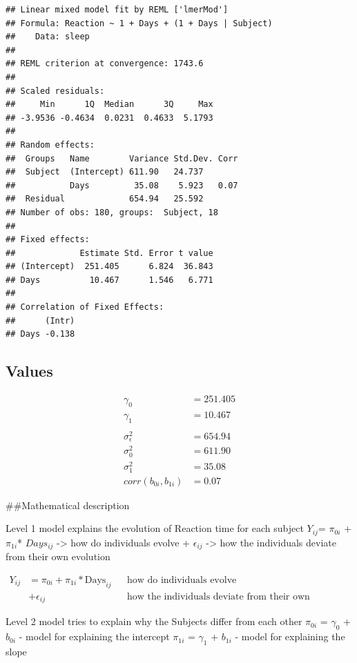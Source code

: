 \documentclass[
]{article}
\begin{document}
\begin{verbatim}
## Linear mixed model fit by REML ['lmerMod']
## Formula: Reaction ~ 1 + Days + (1 + Days | Subject)
##    Data: sleep
## 
## REML criterion at convergence: 1743.6
## 
## Scaled residuals: 
##     Min      1Q  Median      3Q     Max 
## -3.9536 -0.4634  0.0231  0.4633  5.1793 
## 
## Random effects:
##  Groups   Name        Variance Std.Dev. Corr
##  Subject  (Intercept) 611.90   24.737       
##           Days         35.08    5.923   0.07
##  Residual             654.94   25.592       
## Number of obs: 180, groups:  Subject, 18
## 
## Fixed effects:
##             Estimate Std. Error t value
## (Intercept)  251.405      6.824  36.843
## Days          10.467      1.546   6.771
## 
## Correlation of Fixed Effects:
##      (Intr)
## Days -0.138
\end{verbatim}

\hypertarget{values}{%
\subsection{Values}\label{values}}

\[\begin{align}
\gamma_{0}  &= 251.405 \\
\gamma_{1}  &= 10.467  \\
\\
\sigma_{\epsilon}^{2} &= 654.94 \\
\sigma_{0}^{2} &= 611.90 \\
\sigma_{1}^{2} &= 35.08 \\
corr(b_{0i}, b_{1i}) &= 0.07
\end{align}\]

\#\#Mathematical description

Level 1 model explains the evolution of Reaction time for each subject
\(Y_{ij}\)= \(\pi_{0i}\) + \(\pi_{1i}\)* \(Days_{ij}\) -\textgreater{}
how do individuals evolve + \(\epsilon_{ij}\) -\textgreater{} how the
individuals deviate from their own evolution

\[\begin{align}
Y_{ij}&= \pi_{0i} + \pi_{1i}* \text{Days}_{ij} && \text{how do individuals evolve} \\
          &+ \epsilon_{ij} &&\text{how the individuals deviate from their own evolution}
\end{align}\]

Level 2 model tries to explain why the Subjects differ from each other
\(\pi_{0i}\) = \(\gamma_{0}\) + \(b_{0i}\) - model for explaining the
intercept \(\pi_{1i}\) = \(\gamma_{1}\) + \(b_{1i}\) - model for
explaining the slope
\end{document}
